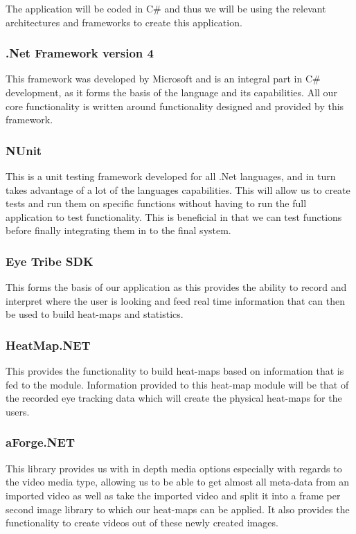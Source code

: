 The application will be coded in C\# and thus we will be using the relevant architectures and frameworks to create this application.

\subsubsection{.Net Framework version 4}
\begin{flushleft}
	This framework was developed by Microsoft and is an integral part in C\# development, as it forms the basis of the language and its capabilities. All our core functionality is written around functionality designed and provided by this framework.
\end{flushleft}

\subsubsection{NUnit}
\begin{flushleft}
This is a unit testing framework developed for all .Net languages, and in turn takes advantage of a lot of the languages capabilities. This will allow us to create tests and run them on specific functions without having to run the full application to test functionality. This is beneficial in that we can test functions before finally integrating them in to the final system.
\end{flushleft}

\subsubsection{Eye Tribe SDK}
\begin{flushleft}
This forms the basis of our application as this provides the ability to record and interpret where the user is looking and feed real time information that can then be used to build heat-maps and statistics.
\end{flushleft}

\subsubsection{HeatMap.NET}
\begin{flushleft}
This provides the functionality to build heat-maps based on information that is fed to the module. Information provided to this heat-map module will be that of the recorded eye tracking data which will create the physical heat-maps for the users.
\end{flushleft}

\subsubsection{aForge.NET}
\begin{flushleft}
This library provides us with in depth media options especially with regards to the video media type, allowing us to be able to get almost all meta-data from an imported video as well as take the imported video and split it into a frame per second image library to which our heat-maps can be applied. It also provides the functionality to create videos out of these newly created images.
\end{flushleft}